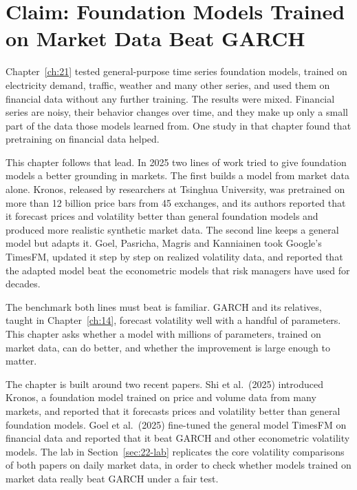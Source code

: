 \makeatletter
{}
\makeatother

\chapter{Claim: Foundation Models Trained on Market Data Beat GARCH}
\label{ch:22}

Chapter~\ref{ch:21} tested general-purpose time series foundation models, trained on electricity demand, traffic, weather and many other series, and used them on financial data without any further training. The results were mixed. Financial series are noisy, their behavior changes over time, and they make up only a small part of the data those models learned from. One study in that chapter found that pretraining on financial data helped.

This chapter follows that lead. In 2025 two lines of work tried to give foundation models a better grounding in markets. The first builds a model from market data alone. Kronos, released by researchers at Tsinghua University, was pretrained on more than 12 billion price bars from 45 exchanges, and its authors reported that it forecast prices and volatility better than general foundation models and produced more realistic synthetic market data. The second line keeps a general model but adapts it. Goel, Pasricha, Magris and Kanniainen took Google's TimesFM, updated it step by step on realized volatility data, and reported that the adapted model beat the econometric models that risk managers have used for decades.

The benchmark both lines must beat is familiar. GARCH and its relatives, taught in Chapter~\ref{ch:14}, forecast volatility well with a handful of parameters. This chapter asks whether a model with millions of parameters, trained on market data, can do better, and whether the improvement is large enough to matter.

The chapter is built around two recent papers. Shi et al.\ (2025) introduced Kronos, a foundation model trained on price and volume data from many markets, and reported that it forecasts prices and volatility better than general foundation models. Goel et al.\ (2025) fine-tuned the general model TimesFM on financial data and reported that it beat GARCH and other econometric volatility models. The lab in Section~\ref{sec:22-lab} replicates the core volatility comparisons of both papers on daily market data, in order to check whether models trained on market data really beat GARCH under a fair test.

